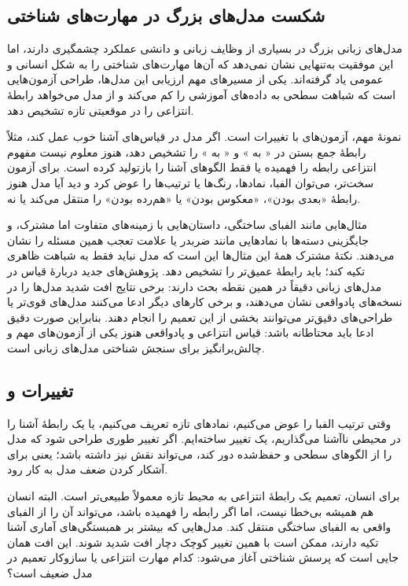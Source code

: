 \subsection{شکست مدل‌های بزرگ در مهارت‌های شناختی}
مدل‌های زبانی بزرگ در بسیاری از وظایف زبانی و دانشی عملکرد چشمگیری دارند، اما این موفقیت به‌تنهایی نشان نمی‌دهد که آن‌ها مهارت‌های شناختی را به شکل انسانی و عمومی یاد گرفته‌اند. یکی از مسیرهای مهم ارزیابی این مدل‌ها، طراحی آزمون‌هایی است که شباهت سطحی به داده‌های آموزشی را کم می‌کند و از مدل می‌خواهد رابطهٔ انتزاعی را در موقعیتی تازه تشخیص دهد.

نمونهٔ مهم، آزمون‌های  با تغییرات  است. اگر مدل در قیاس‌های آشنا خوب عمل کند، مثلاً رابطهٔ جمع بستن در « به » و « به » را تشخیص دهد، هنوز معلوم نیست مفهوم انتزاعی رابطه را فهمیده یا فقط الگوهای آشنا را بازتولید کرده است. برای آزمون سخت‌تر، می‌توان الفبا، نمادها، رنگ‌ها یا ترتیب‌ها را عوض کرد و دید آیا مدل هنوز رابطهٔ «بعدی بودن»، «معکوس بودن» یا «هم‌رده بودن» را منتقل می‌کند یا نه.

مثال‌هایی مانند الفبای ساختگی، داستان‌هایی با زمینه‌های متفاوت اما  مشترک، و جایگزینی دسته‌ها با نمادهایی مانند ضربدر یا علامت تعجب همین مسئله را نشان می‌دهند. نکتهٔ مشترک همهٔ این مثال‌ها این است که مدل نباید فقط به شباهت ظاهری تکیه کند؛ باید رابطهٔ عمیق‌تر را تشخیص دهد. پژوهش‌های جدید دربارهٔ قیاس در مدل‌های زبانی دقیقاً در همین نقطه بحث دارند: برخی نتایج افت شدید مدل‌ها را در نسخه‌های پادواقعی نشان می‌دهند، و برخی کارهای دیگر ادعا می‌کنند مدل‌های قوی‌تر یا طراحی‌های دقیق‌تر می‌توانند بخشی از این تعمیم را انجام دهند. بنابراین صورت دقیق ادعا باید محتاطانه باشد: قیاس انتزاعی و پادواقعی هنوز یکی از آزمون‌های مهم و چالش‌برانگیز برای سنجش شناختی مدل‌های زبانی است.

\subsection{تغییرات  و }
وقتی ترتیب الفبا را عوض می‌کنیم، نمادهای تازه تعریف می‌کنیم، یا یک رابطهٔ آشنا را در محیطی ناآشنا می‌گذاریم، یک تغییر  ساخته‌ایم. اگر تغییر طوری طراحی شود که مدل را از الگوهای سطحی و حفظ‌شده دور کند، می‌تواند نقش  نیز داشته باشد؛ یعنی برای آشکار کردن ضعف مدل به کار رود.

برای انسان، تعمیم یک رابطهٔ انتزاعی به محیط تازه معمولاً طبیعی‌تر است. البته انسان هم همیشه بی‌خطا نیست، اما اگر رابطه را فهمیده باشد، می‌تواند آن را از الفبای واقعی به الفبای ساختگی منتقل کند. مدل‌هایی که بیشتر بر همبستگی‌های آماری آشنا تکیه دارند، ممکن است با همین تغییر کوچک دچار افت شدید شوند. این افت همان جایی است که پرسش شناختی آغاز می‌شود: کدام مهارت انتزاعی یا سازوکار تعمیم در مدل ضعیف است؟

